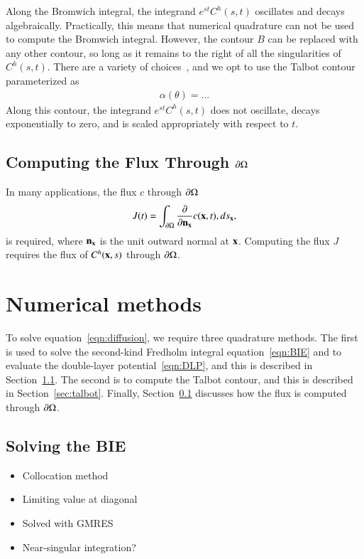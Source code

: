 \documentclass[preprint, 10pt]{elsarticle}
\begin{document}
Along the Bromwich integral, the integrand $e^{st} C^h(s,t)$ oscillates
and decays algebraically. Practically, this means that numerical
quadrature can not be used to compute the Bromwich integral. However,
the contour $B$ can be replaced with any other contour, so long as it
remains to the right of all the singularities of $C^h(s,t)$. There are a
variety of choices~\cite{tre-wei2014}, and we opt to use the Talbot
contour parameterized as
\begin{align*}
  \alpha(\theta) = ...
\end{align*}
Along this contour, the integrand $e^{st} C^h(s,t)$ does not oscillate,
decays exponentially to zero, and is scaled appropriately with respect
to $t$.

\subsection{Computing the Flux Through ${\partial}\Omega$}
\label{sec:flux}
In many applications, the flux $c$ through ${\partial}\Omega$
\begin{align}
  \label{eqn:flux}
  J(t) = \int_{{\partial}\Omega} \frac{\partial }{\partial {\mathbf{n}}_{\mathbf{x}}}c({\mathbf{x}},t), ds_{\mathbf{x}},
\end{align}
is required, where ${\mathbf{n}}_{\mathbf{x}}$ is the unit outward normal at ${\mathbf{x}}$.
Computing the flux $J$ requires the flux of $C^h({\mathbf{x}},s)$ through
${\partial}\Omega$.


\section{Numerical methods}
\label{s:method}
To solve equation~\eqref{eqn:diffusion}, we require three quadrature
methods. The first is used to solve the second-kind Fredholm integral
equation~\eqref{eqn:BIE} and to evaluate the double-layer
potential~\eqref{eqn:DLP}, and this is described in
Section~\ref{sec:BIE}. The second is to compute the Talbot contour, and
this is described in Section~\ref{sec:talbot}. Finally,
Section~\ref{sec:flux} discusses how the flux is computed through
${\partial}\Omega$.

\subsection{Solving the BIE}
\label{sec:BIE}
\begin{itemize}
  \item Collocation method
  \item Limiting value at diagonal
  \item Solved with GMRES
  \item Near-singular integration?
\end{itemize}
\end{document}
